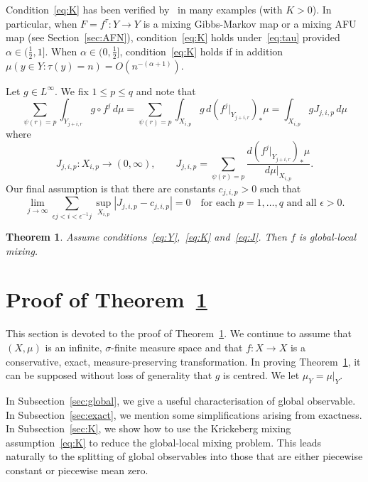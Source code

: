\documentclass[12pt]{article}
\numberwithin{equation}{section}
\newtheorem{thm}{Theorem}[section]
\newcommand{\eps}{\epsilon}
\begin{document}
\begin{rmk} \label{rmk:K}
Condition~\eqref{eq:K} has been verified by~\cite{Gouezel11,MT12} in many examples (with $K>0$).
In particular, 
when $F=f^\tau:Y\to Y$ is a mixing Gibbs-Markov map or a mixing AFU map (see Section~\ref{sec:AFN}), condition~\eqref{eq:K} holds under~\eqref{eq:tau}
provided $\alpha\in(\frac12,1]$.
When $\alpha\in(0,\frac12]$, condition~\eqref{eq:K} holds if in addition $\mu(y\in Y:\tau(y)=n)=O(n^{-(\alpha+1)})$.
\end{rmk}

Let $g\in L^\infty$. We fix $1\le p\le q$ and 
note that 
\[
\sum_{\psi(r)=p}\int_{Y_{j+i,r}}g\circ f^j\,d\mu=
\sum_{\psi(r)=p}\int_{X_{i,p}}g\,d(f^j|_{Y_{j+i,r}})_*\mu=
\int_{X_{i,p}}gJ_{j,i,p}\,d\mu
\]
where 
\[
J_{j,i,p}: X_{i,p}\to(0,\infty), \qquad 
J_{j,i,p} =\sum_{\psi(r)=p}\frac{d(f^j|_{Y_{j+i,r}})_*\mu}{d\mu|_{X_{i,p}}}.
\]
Our final assumption is that there are constants $c_{j,i,p}>0$ such that
\begin{equation} \label{eq:J}
\lim_{j\to\infty}\sum_{\eps j < i < \eps^{-1}j} \sup_{X_{i,p}}|J_{j,i,p}-c_{j,i,p}|=0
\quad\text{for each $p=1,\dots,q$ and all $\eps>0$}.
\end{equation}

\begin{thm} \label{thm:main}
Assume conditions~\eqref{eq:Y},~\eqref{eq:K} and~\eqref{eq:J}.
Then $f$ is global-local mixing.
\end{thm}

\section{Proof of Theorem~\ref{thm:main}}
\label{sec:proof}

This section is devoted to the proof of Theorem~\ref{thm:main}.
We continue to assume that
$(X,\mu)$ is an infinite, $\sigma$-finite measure space and that 
$f:X\to X$ is a conservative, exact, measure-preserving transformation.
In proving Theorem~\ref{thm:main}, it can be supposed without loss of generality that $g$ is centred.
We let $\mu_Y=\mu|_Y$.



In Subsection~\ref{sec:global}, we give a useful characterisation of global observable.
In Subsection~\ref{sec:exact}, we mention some simplifications arising from exactness.
In Subsection~\ref{sec:K}, we show how to use the Krickeberg mixing assumption~\eqref{eq:K} to reduce the global-local mixing problem. This leads naturally to the splitting of global observables into those that are either piecewise constant or piecewise mean zero.
\end{document}
